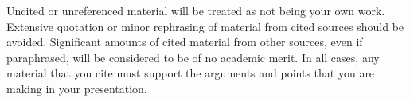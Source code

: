 \documentclass{csse4400}
\begin{document}
Uncited or unreferenced material will be treated as not being your own work.
Extensive quotation or minor rephrasing of material from cited sources should be avoided.
Significant amounts of cited material from other sources, even if paraphrased, will be considered to be of no academic merit.
In all cases, any material that you cite must support the arguments and points that you are making in your presentation.



\end{document}
